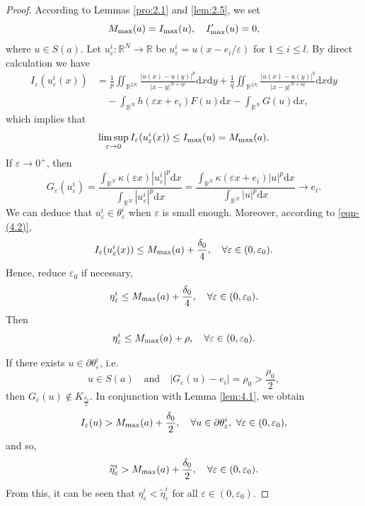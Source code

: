 \documentclass[reqno]{amsart}
\begin{document}
\begin{proof}According to Lemmas \ref{pro:2.1} and \ref{lem:2.5}, we set
$$
M_{\rm max}(a)=I_{\rm max}(u),\quad I_{\rm max}'(u)=0,
$$
where $u\in S(a)$. Let $u_\varepsilon^{i}:\mathbb{R}^N\to\mathbb{R}$ be 
$u_\varepsilon^{i}=u(x-e_i/\varepsilon)$ for $1\le i\le l$.
By direct calculation we have
\begin{align*}
I_{\varepsilon}(u_\varepsilon^{i}(x))
&= \frac{1}{p}\iint_{\mathbb{R}^{2N}}\frac{|u(x)-u(y)|^{p}}{|x-y|^{N+sp}}\mathrm{d}x\mathrm{d}y+\frac{1}{q}\iint_{\mathbb{R}^{2N}}\frac{|u(x)-u(y)|^{q}}{|x-y|^{N+sq}}\mathrm{d}x\mathrm{d}y\\
&\quad -\int_{\mathbb{R}^N}h(\varepsilon x+e_i)F(u)\mathrm{d}x-\int_{\mathbb{R}^N}G(u)\mathrm{d}x,
\end{align*}
which implies that
\begin{equation}\label{eqn-(4.2)}
\limsup_{\varepsilon\to0}I_{\varepsilon}(u_\varepsilon^{i}(x))
\le I_{\rm max}(u)=M_{\rm max}(a).
\end{equation}
If $\varepsilon\to0^{+}$, then
$$
G_{\varepsilon}(u_\varepsilon^{i})
=\frac{\int_{\mathbb{R}^N}\kappa(\varepsilon x)|u_\varepsilon^{i}|^{p}\mathrm{d}x}
{\int_{\mathbb{R}^N}|u_\varepsilon^{i}|^{p}\mathrm{d}x}
=\frac{\int_{\mathbb{R}^N}\kappa(\varepsilon x+e_i)|u|^{p}\mathrm{d}x}
{\int_{\mathbb{R}^N}|u|^{p}\mathrm{d}x}\to e_i.
$$
 We can deduce that $u_\varepsilon^{i}\in\theta_\varepsilon^{i}$ when 
$\varepsilon$ is small enough. Moreover, according to \eqref{eqn-(4.2)},
$$
I_{\varepsilon}(u_\varepsilon^{i}(x))
\le M_{\rm max}(a)+\frac{\delta_0}{4},\quad\forall\varepsilon\in(0,\varepsilon_0). 
$$
Hence, reduce $\varepsilon_0$ if necessary,
$$
\eta_\varepsilon^{i}\le M_{\rm max}(a)+\frac{\delta_0}{4}, 
\quad\forall\varepsilon\in(0,\varepsilon_0).
$$
Then
$$
\eta_\varepsilon^{i}\le M_{\rm max}(a)+\rho,\quad
\forall\varepsilon\in(0,\varepsilon_0).
$$

If there exists $u\in\partial\theta_\varepsilon^{i}$, i.e.
$$
u\in S(a)\quad \text{and} \quad |G_{\varepsilon}(u)-e_i|=\rho_0>\frac{\rho_0}{2},
$$
then $G_{\varepsilon}(u)\not\in K_{\frac{\rho_0}{2}}$.
 In conjunction with Lemma \ref{lem:4.1}, we obtain
$$
I_\varepsilon(u)>M_{\rm max}(a)+\frac{\delta_0}{2},\quad
\forall u\in\partial\theta_\varepsilon^{i},~\forall \varepsilon\in(0,\varepsilon_0),
$$
and so,
$$
\widetilde\eta_\varepsilon^{i}>M_{\rm max}(a)+\frac{\delta_0}{2},\quad
\forall\varepsilon\in(0,\varepsilon_0).
$$
From this, it can be seen that
$\eta_\varepsilon^{i}<\widetilde\eta_\varepsilon^{i}$ for all 
$\varepsilon\in(0,\varepsilon_0)$.
\end{proof}
\end{document}
